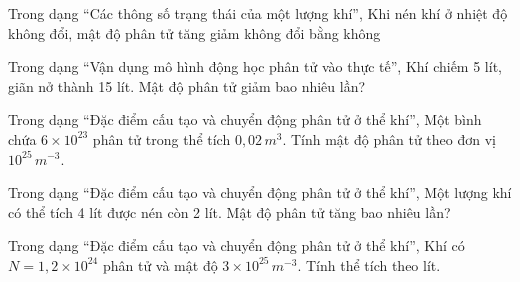 \begin{ex}
Trong dạng “Các thông số trạng thái của một lượng khí”, Khi nén khí ở nhiệt độ không đổi, mật độ phân tử
\choice
{\True tăng}
{giảm}
{không đổi}
{bằng không}
\end{ex}

\begin{ex}
Trong dạng “Vận dụng mô hình động học phân tử vào thực tế”, Khí chiếm 5 lít, giãn nở thành 15 lít. Mật độ phân tử giảm bao nhiêu lần?
\end{ex}

\begin{ex}
Trong dạng “Đặc điểm cấu tạo và chuyển động phân tử ở thể khí”, Một bình chứa $6\times10^{23}$ phân tử trong thể tích $0,02\,m^3$. Tính mật độ phân tử theo đơn vị $10^{25}\,m^{-3}$.
\end{ex}

\begin{ex}
Trong dạng “Đặc điểm cấu tạo và chuyển động phân tử ở thể khí”, Một lượng khí có thể tích 4 lít được nén còn 2 lít. Mật độ phân tử tăng bao nhiêu lần?
\end{ex}

\begin{ex}
Trong dạng “Đặc điểm cấu tạo và chuyển động phân tử ở thể khí”, Khí có $N=1,2\times10^{24}$ phân tử và mật độ $3\times10^{25}\,m^{-3}$. Tính thể tích theo lít.
\end{ex}

